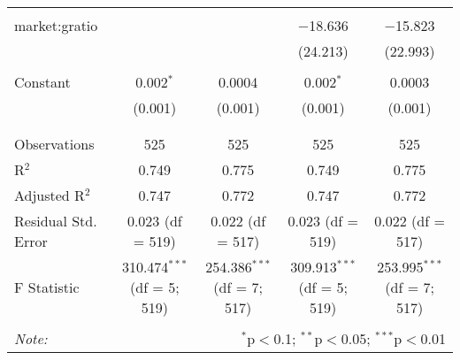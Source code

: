 \begin{table}[!htbp]
\begin{tabular}{@{\extracolsep{5pt}}lcccc}
  & & & & \\ 
 market:gratio &  &  & $-$18.636 & $-$15.823 \\ 
  &  &  & (24.213) & (22.993) \\ 
  & & & & \\ 
 Constant & 0.002$^{*}$ & 0.0004 & 0.002$^{*}$ & 0.0003 \\ 
  & (0.001) & (0.001) & (0.001) & (0.001) \\ 
  & & & & \\ 
\hline \\[-1.8ex] 
Observations & 525 & 525 & 525 & 525 \\ 
R$^{2}$ & 0.749 & 0.775 & 0.749 & 0.775 \\ 
Adjusted R$^{2}$ & 0.747 & 0.772 & 0.747 & 0.772 \\ 
Residual Std. Error & 0.023 (df = 519) & 0.022 (df = 517) & 0.023 (df = 519) & 0.022 (df = 517) \\ 
F Statistic & 310.474$^{***}$ (df = 5; 519) & 254.386$^{***}$ (df = 7; 517) & 309.913$^{***}$ (df = 5; 519) & 253.995$^{***}$ (df = 7; 517) \\ 
\hline 
\hline \\[-1.8ex] 
\textit{Note:}  & \multicolumn{4}{r}{$^{*}$p$<$0.1; $^{**}$p$<$0.05; $^{***}$p$<$0.01} \\ 
\end{tabular} 
\end{table} 
